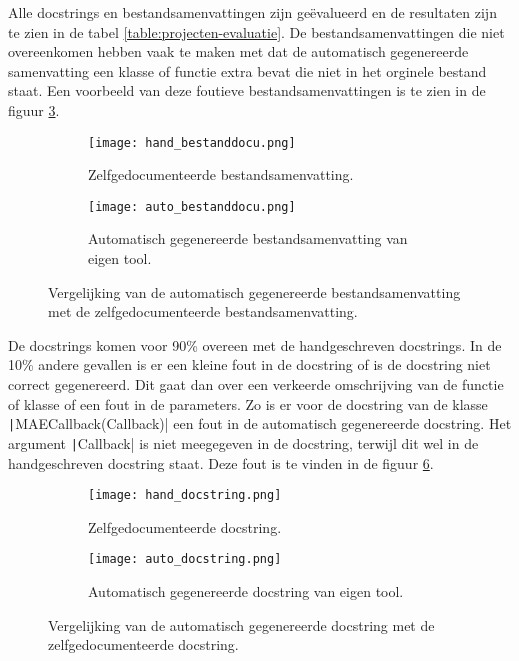 Alle docstrings en bestandsamenvattingen zijn geëvalueerd en de resultaten zijn te zien in de tabel \ref{table:projecten-evaluatie}.
De bestandsamenvattingen die niet overeenkomen hebben vaak te maken met dat de automatisch gegenereerde samenvatting een klasse of functie extra bevat die niet in het orginele bestand staat.
Een voorbeeld van deze foutieve bestandsamenvattingen is te zien in de figuur \ref{fig:evaluate-bestand-samenvatting}.

\begin{figure}
    \centering
    \begin{subfigure}[b]{0.5\textwidth}
        \centering
        \texttt{[image: hand\_bestanddocu.png]}
        \caption{Zelfgedocumenteerde bestandsamenvatting.}
        \label{fig:zelfgedocumenteerd-bestandsamenvatting}
    \end{subfigure}
    \hfill
    \begin{subfigure}[b]{0.5\textwidth}
        \centering
        \texttt{[image: auto\_bestanddocu.png]}
        \caption{Automatisch gegenereerde bestandsamenvatting van eigen tool.}
        \label{fig:automatisch-bestandsamenvatting}
    \end{subfigure}
    \caption{Vergelijking van de automatisch gegenereerde bestandsamenvatting met de zelfgedocumenteerde bestandsamenvatting.}
    \label{fig:evaluate-bestand-samenvatting}
\end{figure}

De docstrings komen voor 90\% overeen met de handgeschreven docstrings.
In de 10\% andere gevallen is er een kleine fout in de docstring of is de docstring niet correct gegenereerd.
Dit gaat dan over een verkeerde omschrijving van de functie of klasse of een fout in de parameters.
Zo is er voor de docstring van de klasse \texttt|MAECallback(Callback)| een fout in de automatisch gegenereerde docstring.
Het argument \texttt|Callback| is niet meegegeven in de docstring, terwijl dit wel in de handgeschreven docstring staat.
Deze fout is te vinden in de figuur \ref{fig:evaluate-docstring}.

\begin{figure}
    \centering
    \begin{subfigure}[b]{0.5\textwidth}
        \centering
        \texttt{[image: hand\_docstring.png]}
        \caption{Zelfgedocumenteerde docstring.}
        \label{fig:zelfgedocumenteerd-docstring}
    \end{subfigure}
    \hfill
    \begin{subfigure}[b]{0.5\textwidth}
        \centering
        \texttt{[image: auto\_docstring.png]}
        \caption{Automatisch gegenereerde docstring van eigen tool.}
        \label{fig:automatisch-docstring}
    \end{subfigure}
    \caption{Vergelijking van de automatisch gegenereerde docstring met de zelfgedocumenteerde docstring.}
    \label{fig:evaluate-docstring}
\end{figure}

